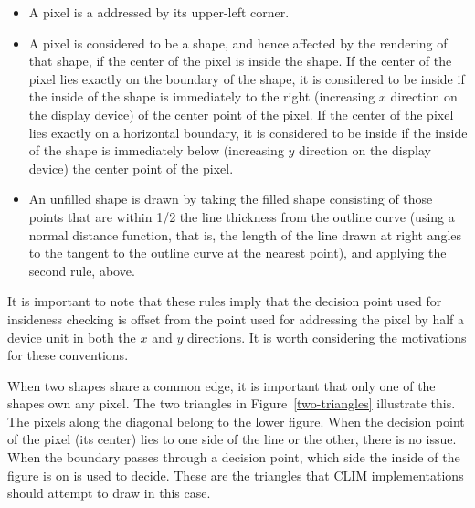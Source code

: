 \begin{itemize}
\item A pixel is a addressed by its upper-left corner.

\item A pixel is considered to be  a shape, and hence affected
by the rendering of that shape, if the center of the pixel is inside the shape.
If the center of the pixel lies exactly on the boundary of the shape, it is
considered to be inside if the inside of the shape is immediately to the right
(increasing $x$ direction on the display device) of the center point of the
pixel.  If the center of the pixel lies exactly on a horizontal boundary, it is
considered to be inside if the inside of the shape is immediately below
(increasing $y$ direction on the display device) the center point of the pixel.

\item An unfilled shape is drawn by taking the filled shape consisting of those
points that are within 1/2 the line thickness from the outline curve (using a
normal distance function, that is, the length of the line drawn at right angles
to the tangent to the outline curve at the nearest point), and applying the
second rule, above.
\end{itemize}

It is important to note that these rules imply that the decision point used for
insideness checking is offset from the point used for addressing the pixel by
half a device unit in both the $x$ and $y$ directions.  It is worth considering
the motivations for these conventions.

When two shapes share a common edge, it is important that only one of the shapes
own any pixel.  The two triangles in Figure~\ref{two-triangles} illustrate this.
The pixels along the diagonal belong to the lower figure.  When the decision
point of the pixel (its center) lies to one side of the line or the other, there
is no issue.  When the boundary passes through a decision point, which side the
inside of the figure is on is used to decide.  These are the triangles that CLIM
implementations should attempt to draw in this case.

